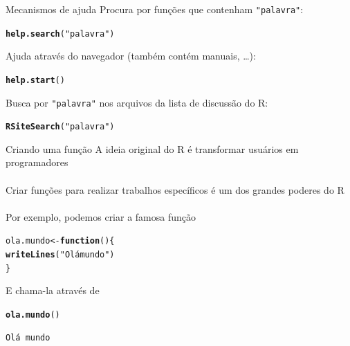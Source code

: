 \documentclass[10pt,handout]{beamer}\usepackage[]{graphicx}\usepackage[]{color}
\makeatletter
\newcommand{\hlstr}[1]{\textcolor[rgb]{0.192,0.494,0.8}{#1}}%
\newcommand{\hlstd}[1]{\textcolor[rgb]{0.345,0.345,0.345}{#1}}%
\newcommand{\hlkwa}[1]{\textcolor[rgb]{0.161,0.373,0.58}{\textbf{#1}}}%
\newcommand{\hlkwb}[1]{\textcolor[rgb]{0.69,0.353,0.396}{#1}}%
\newcommand{\hlkwd}[1]{\textcolor[rgb]{0.737,0.353,0.396}{\textbf{#1}}}%
\newenvironment{kframe}{%
 \def\at@end@of@kframe{}%
 \ifinner\ifhmode%
  \def\at@end@of@kframe{\end{minipage}}%
  \begin{minipage}{\columnwidth}%
 \fi\fi%
 \def\FrameCommand##1{\hskip\@totalleftmargin \hskip-\fboxsep
 \colorbox{shadecolor}{##1}\hskip-\fboxsep
     \hskip-\linewidth \hskip-\@totalleftmargin \hskip\columnwidth}%
 \MakeFramed {\advance\hsize-\width
   \@totalleftmargin\z@ \linewidth\hsize
   \@setminipage}}%
 {\par\unskip\endMakeFramed%
 \at@end@of@kframe}
\newenvironment{knitrout}{}{} %
\makeatother
\begin{document}
\begin{frame}[fragile]{Mecanismos de ajuda}
Procura por funções que contenham \texttt{"palavra"}:
\begin{knitrout}\small
{}\color{fgcolor}\begin{kframe}
\begin{alltt}
\hlkwd{help.search}\hlstd{(}\hlstr{"palavra"}\hlstd{)}
\end{alltt}
\end{kframe}
\end{knitrout}
Ajuda através do navegador (também contém manuais, \ldots):
\begin{knitrout}\small
{}\color{fgcolor}\begin{kframe}
\begin{alltt}
\hlkwd{help.start}\hlstd{()}
\end{alltt}
\end{kframe}
\end{knitrout}
Busca por \texttt{"palavra"} nos arquivos da lista de discussão do R:
\begin{knitrout}\small
{}\color{fgcolor}\begin{kframe}
\begin{alltt}
\hlkwd{RSiteSearch}\hlstd{(}\hlstr{"palavra"}\hlstd{)}
\end{alltt}
\end{kframe}
\end{knitrout}
\end{frame}

\begin{frame}[fragile]{Criando uma função}
  A ideia original do R é transformar usuários em programadores \\~\\
  Criar funções para realizar trabalhos específicos é um dos grandes
  poderes do R \\~\\
  Por exemplo, podemos criar a famosa função
\begin{knitrout}\small
{}\color{fgcolor}\begin{kframe}
\begin{alltt}
\hlstd{ola.mundo} \hlkwb{<-} \hlkwa{function}\hlstd{()\{}
    \hlkwd{writeLines}\hlstd{(}\hlstr{"Olá mundo"}\hlstd{)}
\hlstd{\}}
\end{alltt}
\end{kframe}
\end{knitrout}
E chama-la através de
\begin{knitrout}\small
{}\color{fgcolor}\begin{kframe}
\begin{alltt}
\hlkwd{ola.mundo}\hlstd{()}
\end{alltt}
\begin{verbatim}
Olá mundo
\end{verbatim}
\end{kframe}
\end{knitrout}
\end{frame}
\end{document}
